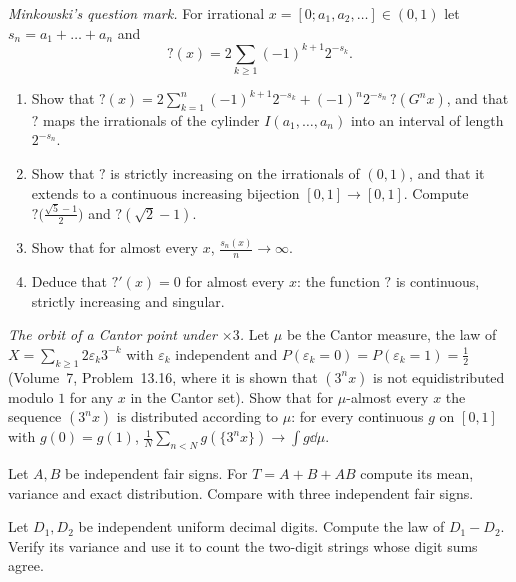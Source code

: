 \begin{exercise}[$\star\star\star$]\label{pb:minkowski}
\emph{Minkowski's question mark.} For irrational $x=[0;a_1,a_2,\dots]\in(0,1)$ let $s_n=a_1+\dots+a_n$ and
\[
?(x)=2\sum_{k\ge1}(-1)^{k+1}2^{-s_k}.
\]
\begin{enumerate}[label=(\alph*)]
\item Show that $?(x)=2\sum_{k=1}^n(-1)^{k+1}2^{-s_k}+(-1)^n2^{-s_n}\,?(G^nx)$, and that $?$ maps the irrationals of the cylinder
$I(a_1,\dots,a_n)$ into an interval of length $2^{-s_n}$.
\item Show that $?$ is strictly increasing on the irrationals of $(0,1)$, and that it extends to a continuous increasing bijection
$[0,1]\to[0,1]$. Compute $?\bigl(\frac{\sqrt5-1}2\bigr)$ and $?(\sqrt2-1)$.
\item Show that for almost every $x$, $\frac{s_n(x)}n\to\infty$.
\item Deduce that $?'(x)=0$ for almost every $x$: the function $?$ is continuous, strictly increasing and singular.
\end{enumerate}
\end{exercise}
\begin{exercise}[$\star\star$]\label{pb:cantororbit}
\emph{The orbit of a Cantor point under $\times3$.} Let $\mu$ be the Cantor measure, the law of $X=\sum_{k\ge1}2\varepsilon_k3^{-k}$ with $\varepsilon_k$ independent and
$P(\varepsilon_k=0)=P(\varepsilon_k=1)=\frac12$ (Volume~7, Problem~13.16, where it is shown that $(3^nx)$ is not equidistributed modulo $1$ for any $x$ in the Cantor set).
Show that for $\mu$-almost every $x$ the sequence $(3^nx)$ is distributed according to $\mu$: for every
continuous $g$ on $[0,1]$ with $g(0)=g(1)$, $\frac1N\sum_{n<N}g(\{3^nx\})\to\int g\dd\mu$.
\end{exercise}

\begin{exercise}[$\star$]\label{pb:v11-ch14-pairwise-four}
Let $A,B$ be independent fair signs. For $T=A+B+AB$ compute its mean, variance and exact distribution. Compare with three independent fair signs.
\end{exercise}

\begin{exercise}[$\star\star$]\label{pb:v11-ch14-digit-sum}
Let $D_1,D_2$ be independent uniform decimal digits. Compute the law of $D_1-D_2$. Verify its variance and use it to count the two-digit strings whose digit sums agree.
\end{exercise}

